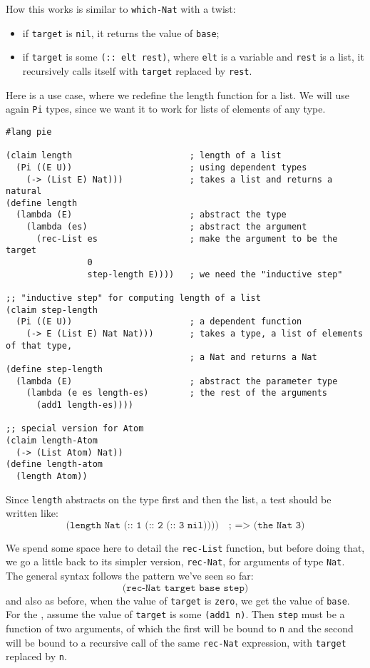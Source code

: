 How this works is similar to \texttt{which-Nat} with a twist:
\begin{itemize}
\item if \texttt{target} is \texttt{nil}, it returns the value
  of \texttt{base};
\item if \texttt{target} is some \texttt{(:: elt rest)},
  where \texttt{elt} is a variable and \texttt{rest} is a list, it
  recursively calls itself with \texttt{target} replaced by \texttt{rest}.
\end{itemize}

Here is a use case, where we redefine the length function for a list. We will
use again \texttt{Pi} types, since we want it to work for lists of elements
of any type.
{
  \small
\begin{verbatim}
#lang pie

(claim length                       ; length of a list
  (Pi ((E U))                       ; using dependent types
    (-> (List E) Nat)))             ; takes a list and returns a natural
(define length
  (lambda (E)                       ; abstract the type
    (lambda (es)                    ; abstract the argument
      (rec-List es                  ; make the argument to be the target
                0
                step-length E))))   ; we need the "inductive step"

;; "inductive step" for computing length of a list
(claim step-length
  (Pi ((E U))                       ; a dependent function
    (-> E (List E) Nat Nat)))       ; takes a type, a list of elements of that type,
                                    ; a Nat and returns a Nat
(define step-length
  (lambda (E)                       ; abstract the parameter type
    (lambda (e es length-es)        ; the rest of the arguments
      (add1 length-es))))

;; special version for Atom
(claim length-Atom
  (-> (List Atom) Nat))
(define length-atom
  (length Atom))
\end{verbatim}
}

Since \texttt{length} abstracts on the type first and then the list,
a test should be written like:
\[
  \texttt{(length Nat (:: 1 (:: 2 (:: 3 nil))))} \quad \texttt{; => (the Nat 3)}
\]


We spend some space here to detail the \texttt{rec-List} function, but before doing
that, we go a little back to its simpler version, \texttt{rec-Nat}, for arguments
of type \texttt{Nat}. The general syntax follows the pattern we've seen so far:
\[
  \texttt{(rec-Nat target base step)}
\]
and also as before, when the value of \texttt{target} is \texttt{zero},
we get the value of \texttt{base}. For the , assume
the value of \texttt{target} is some \texttt{(add1 n)}. Then \texttt{step} must
be a function of two arguments, of which the first will be bound to \texttt{n}
and the second will be bound to a recursive call of the same \texttt{rec-Nat}
expression, with \texttt{target} replaced by \texttt{n}.

